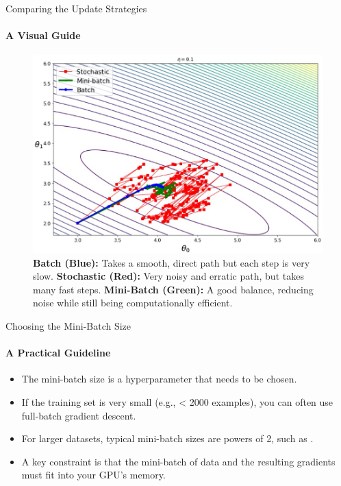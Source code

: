\begin{frame}{Comparing the Update Strategies}
    \framesubtitle{A Visual Guide}
    \begin{figure}
        \centering
        \includegraphics[width=0.9\linewidth]{images/optimizer_paths.png}
        \caption{
            \textbf{Batch (Blue):} Takes a smooth, direct path but each step is very slow.
            \textbf{Stochastic (Red):} Very noisy and erratic path, but takes many fast steps.
            \textbf{Mini-Batch (Green):} A good balance, reducing noise while still being computationally efficient.
        }
    \end{figure}
\end{frame}

\begin{frame}{Choosing the Mini-Batch Size}
    \framesubtitle{A Practical Guideline}
    \begin{itemize}
        \item The mini-batch size is a hyperparameter that needs to be chosen.
        \item If the training set is very small (e.g., < 2000 examples), you can often use full-batch gradient descent.
        \item For larger datasets, typical mini-batch sizes are powers of 2, such as .
        \item A key constraint is that the mini-batch of data and the resulting gradients must fit into your GPU's memory.
    \end{itemize}
\end{frame}